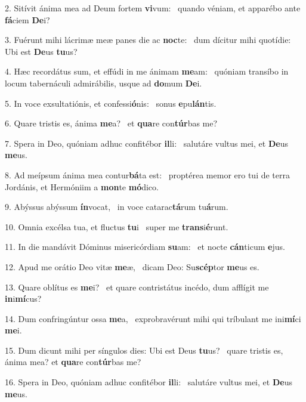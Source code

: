 2. Sitívit ánima mea ad Deum fortem \textbf{vi}vum: \ast\  quando véniam, et apparébo ante \textbf{fá}ciem \textbf{De}i?\

3. Fuérunt mihi lácrimæ meæ panes die ac \textbf{noc}te: \ast\  dum dícitur mihi quotídie: Ubi est \textbf{De}us \textbf{tu}us?\

4. Hæc recordátus sum, et effúdi in me ánimam \textbf{me}am: \ast\  quóniam transíbo in locum tabernáculi admirábilis, usque ad \textbf{do}mum \textbf{De}i.\

5. In voce exsultatiónis, et confessi\textbf{ó}nis: \ast\  sonus \textbf{e}pu\textbf{lán}tis.\

6. Quare tristis es, ánima \textbf{me}a? \ast\  et \textbf{qua}re con\textbf{túr}bas me?\

7. Spera in Deo, quóniam adhuc confitébor \textbf{il}li: \ast\  salutáre vultus mei, et \textbf{De}us \textbf{me}us.\

8. Ad meípsum ánima mea contur\textbf{bá}ta est: \ast\  proptérea memor ero tui de terra Jordánis, et Hermóniim a \textbf{mon}te \textbf{mó}dico.\

9. Abýssus abýssum \textbf{ín}vocat, \ast\  in voce catarac\textbf{tá}rum tu\textbf{á}rum.\

10. Omnia excélsa tua, et fluctus \textbf{tu}i \ast\  super me \textbf{trans}i\textbf{é}runt.\

11. In die mandávit Dóminus misericórdiam \textbf{su}am: \ast\  et nocte \textbf{cán}ticum \textbf{e}jus.\

12. Apud me orátio Deo vitæ \textbf{me}æ, \ast\  dicam Deo: Su\textbf{scép}tor \textbf{me}us es.\

13. Quare oblítus es \textbf{me}i? \ast\  et quare contristátus incédo, dum afflígit me \textbf{in}i\textbf{mí}cus?\

14. Dum confringúntur ossa \textbf{me}a, \ast\  exprobravérunt mihi qui tríbulant me ini\textbf{mí}ci \textbf{me}i.\

15. Dum dicunt mihi per síngulos dies: Ubi est Deus \textbf{tu}us? \ast\  quare tristis es, ánima mea? et \textbf{qua}re con\textbf{túr}bas me?\

16. Spera in Deo, quóniam adhuc confitébor \textbf{il}li: \ast\  salutáre vultus mei, et \textbf{De}us \textbf{me}us.\

